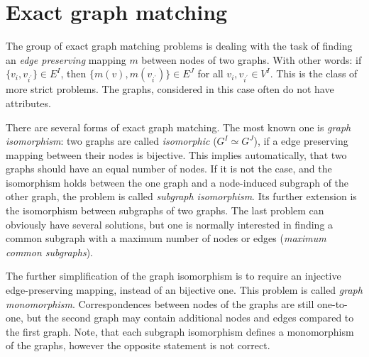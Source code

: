 \section{Exact graph matching}
The group of exact graph matching problems is dealing with the task of finding an \emph{edge preserving} mapping $m$ between nodes of two graphs. With other words: if $\{v_i,v_{i^\prime}\}\in E^I$, then $\{m(v),m(v_{i^\prime})\}\in E^J$ for all $v_i,v_{i^\prime}\in V^I$. This is the class of more strict problems. The graphs, considered in this case often do not have attributes.

There are several forms of exact graph matching. The most known one is \emph{graph isomorphism}: two graphs are called \emph{isomorphic} ($G^I\simeq G^J$), if a edge preserving mapping between their nodes is bijective. This implies automatically, that two graphs should have an equal number of nodes. If it is not the case, and the isomorphism holds between the one graph and a node-induced subgraph of the other graph, the problem is called \emph{subgraph isomorphism}. Its further extension is the isomorphism between subgraphs of two graphs. The last problem can obviously have several solutions, but one is normally interested in finding a common subgraph with a maximum number of nodes or edges (\emph{maximum common subgraphs}).  

The further simplification of the graph isomorphism is to require an injective edge-preserving mapping, instead of an bijective one. This problem is called \emph{graph monomorphism}. Correspondences between nodes of the graphs are still one-to-one, but the second graph may contain additional nodes and edges compared to the first graph. Note, that each subgraph isomorphism defines a monomorphism of the graphs, however the opposite statement is not correct.

